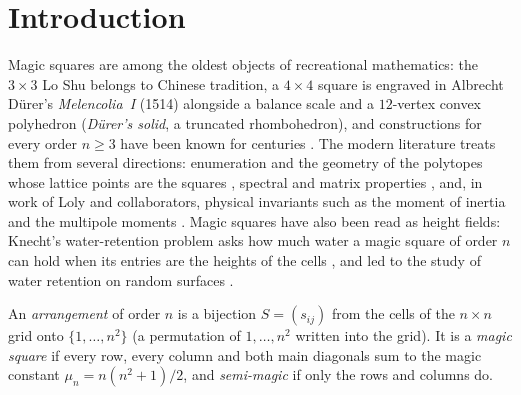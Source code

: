 \section{Introduction}
\label{sec:introduction}

Magic squares are among the oldest objects of recreational mathematics: the $3\times3$ Lo Shu belongs to Chinese tradition, a $4\times4$ square is engraved in Albrecht D\"urer's \emph{Melencolia~I} (1514) alongside a balance scale and a $12$-vertex convex polyhedron (\emph{D\"urer's solid}, a truncated rhombohedron), and constructions for every order $n\ge3$ have been known for centuries \cite{andrews1960magic,pickover2002zen}.
The modern literature treats them from several directions: enumeration and the geometry of the polytopes whose lattice points are the squares \cite{stanley1973magic,ehrhart1973magic,ahmed2003polyhedral,beck2006insideout,beck2010enumeration}, spectral and matrix properties \cite{loly2009spectra,nordgren2012properties,nordgren2014spectra,cameron2013signatura}, and, in work of Loly and collaborators, physical invariants such as the moment of inertia and the multipole moments \cite{loly2004invariance,rogers2004inertia,rogers2005multipole}.
Magic squares have also been read as height fields: Knecht's water-retention problem asks how much water a magic square of order $n$ can hold when its entries are the heights of the cells \cite{oeis_A201126}, and led to the study of water retention on random surfaces \cite{knecht2012retention}.

\begin{definition}
\label{def:magic_square}
An \emph{arrangement} of order $n$ is a bijection $S=(s_{ij})$ from the cells of the $n\times n$ grid onto $\{1,\dots,n^2\}$ (a permutation of $1,\dots,n^2$ written into the grid).
It is a \emph{magic square} if every row, every column and both main diagonals sum to the magic constant $\mu_n=n(n^2+1)/2$, and \emph{semi-magic} if only the rows and columns do.
\end{definition}

